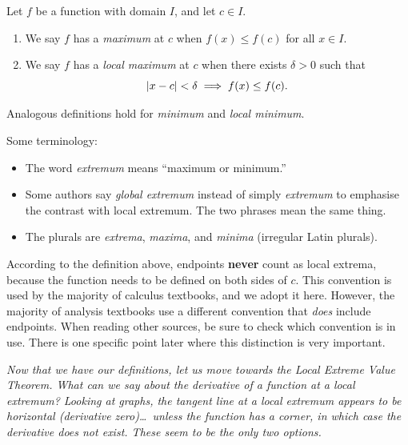 \begin{definition}
\label{def:5-1}
Let $f$ be a function with domain $I$, and let $c \in I$.
\begin{enumerate}[label=(\roman*)]
  \item We say $f$ has a \emph{maximum} at $c$ when $f(x) \leq f(c)$ for all $x \in I$.
  \item We say $f$ has a \emph{local maximum} at $c$ when there exists $\delta > 0$ such that
  \[
    \left\lvert x - c \right\rvert < \delta \;\Longrightarrow\; f(x) \leq f(c).
  \]
\end{enumerate}
Analogous definitions hold for \emph{minimum} and \emph{local minimum}.
\end{definition}

\begin{remark}
Some terminology:
\begin{itemize}
  \item The word \emph{extremum} means ``maximum or minimum.''
  \item Some authors say \emph{global extremum} instead of simply \emph{extremum} to emphasise the contrast with local extremum.  The two phrases mean the same thing.
  \item The plurals are \emph{extrema}, \emph{maxima}, and \emph{minima} (irregular Latin plurals).
\end{itemize}
\end{remark}

\begin{remark}[Warning]
According to the definition above, endpoints \textbf{never} count as local extrema, because the function needs to be defined on both sides of $c$.  This convention is used by the majority of calculus textbooks, and we adopt it here.  However, the majority of analysis textbooks use a different convention that \emph{does} include endpoints.  When reading other sources, be sure to check which convention is in use.  There is one specific point later where this distinction is very important.
\end{remark}

\textit{Now that we have our definitions, let us move towards the Local Extreme Value Theorem.  What can we say about the derivative of a function at a local extremum?  Looking at graphs, the tangent line at a local extremum appears to be horizontal (derivative zero)\ldots\ unless the function has a corner, in which case the derivative does not exist.  These seem to be the only two options.}

